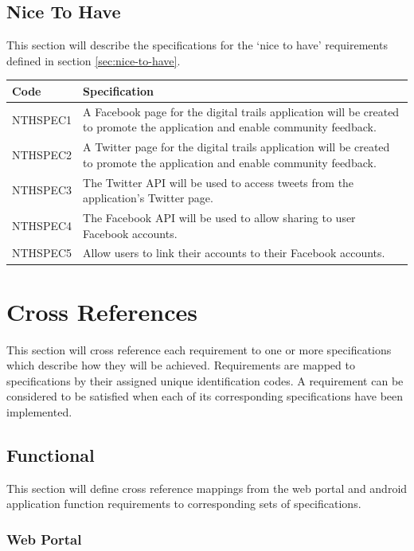 \documentclass[11pt,a4paper]{article}
\begin{document}
\subsection{Nice To Have}
\label{sec:nice-to-have-specs}

This section will describe the specifications for the `nice to have' requirements defined in section \ref{sec:nice-to-have}.

\begin{longtable}{|p{2.5cm}p{13cm}|}
\hline
\textbf{Code} & \textbf{Specification} \\

\hline
NTHSPEC1 & A Facebook page for the digital trails application will be created to promote the application and enable community feedback. \\ \hline
NTHSPEC2 &  A Twitter page for the digital trails application will be created to promote the application and enable community feedback. \\ \hline
NTHSPEC3 & The Twitter API will be used to access tweets from the application's Twitter page. \\ \hline
NTHSPEC4 & The Facebook API will be used to allow sharing to user Facebook accounts. \\ \hline
NTHSPEC5 & Allow users to link their accounts to their Facebook accounts. \\ \hline
\end{longtable}


\section{Cross References}
\label{sec:cross-refs}

This section will cross reference each requirement to one or more specifications which describe how they will be achieved.
Requirements are mapped to specifications by their assigned unique identification codes.
A requirement can be considered to be satisfied when each of its corresponding specifications have been implemented.

\subsection{Functional}

This section will define cross reference mappings from the web portal and android application function requirements to corresponding sets of specifications.

\subsubsection{Web Portal}
\end{document}
